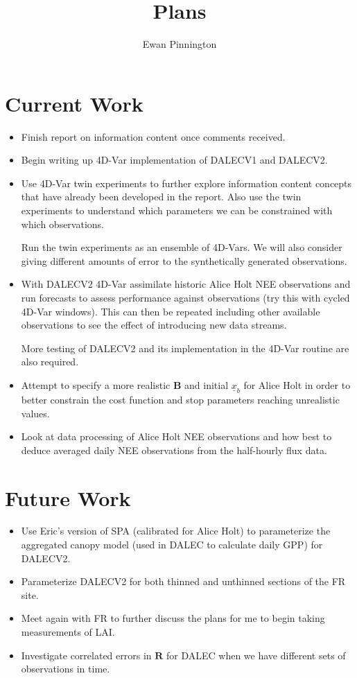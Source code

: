 \documentclass[11pt]{article}
\title{Plans}
\author{Ewan Pinnington}
\date
\begin{document}
\maketitle

\section*{Current Work}
\begin{itemize}
\item Finish report on information content once comments received.

\item Begin writing up 4D-Var implementation of DALECV1 and DALECV2.

\item Use 4D-Var twin experiments to further explore information content concepts that have already been developed in the report. Also use the twin experiments to understand which parameters we can be constrained with which observations.

Run the twin experiments as an ensemble of 4D-Vars. We will also consider giving different amounts of error to the synthetically generated observations. 

\item With DALECV2 4D-Var assimilate historic Alice Holt NEE observations and run forecasts to assess performance against observations (try this with cycled 4D-Var windows). This can then be repeated including other available observations to see the effect of introducing new data streams. 

More testing of DALECV2 and its implementation in the 4D-Var routine are also required.

\item Attempt to specify a more realistic $\textbf{B}$ and initial $\underline{x}_{b}$ for Alice Holt in order to better constrain the cost function and stop parameters reaching unrealistic values.

\item Look at data processing of Alice Holt NEE observations and how best to deduce averaged daily NEE observations from the half-hourly flux data.
\end{itemize}


\section*{Future Work}
\begin{itemize}
\item Use Eric's version of SPA (calibrated for Alice Holt) to parameterize the aggregated canopy model (used in DALEC to calculate daily GPP) for DALECV2.

\item Parameterize DALECV2 for both thinned and unthinned sections of the FR site.

\item Meet again with FR to further discuss the plans for me to begin taking measurements of LAI.

\item Investigate correlated errors in $\textbf{R}$ for DALEC when we have different sets of observations in time.
\end{itemize}
\end{document}
